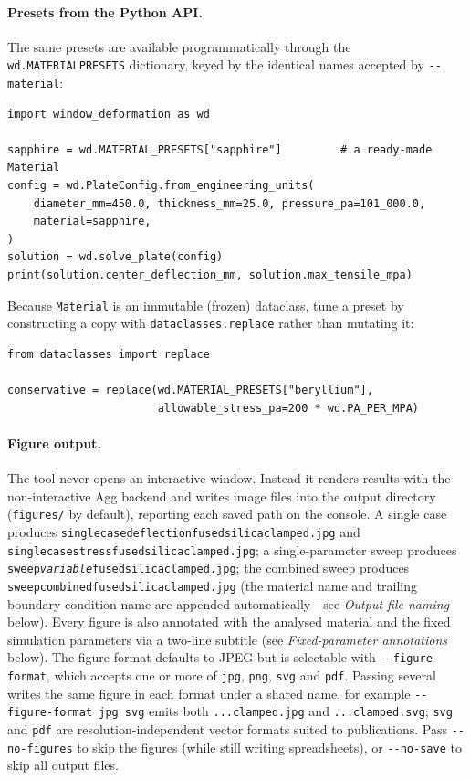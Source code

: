 \documentclass[11pt]{article}
\newcommand{\codeus}{\textunderscore\allowbreak}
\DeclareRobustCommand{\code}[1]{\texttt{\ifmmode\else\renewcommand{\_}{\codeus}\fi#1}}
\begin{document}
\paragraph{Presets from the Python API.} The same presets are available
programmatically through the \code{wd.MATERIAL\_PRESETS} dictionary, keyed by the
identical names accepted by \code{-{}-material}:
\begin{lstlisting}[style=pystyle]
import window_deformation as wd

sapphire = wd.MATERIAL_PRESETS["sapphire"]         # a ready-made Material
config = wd.PlateConfig.from_engineering_units(
    diameter_mm=450.0, thickness_mm=25.0, pressure_pa=101_000.0,
    material=sapphire,
)
solution = wd.solve_plate(config)
print(solution.center_deflection_mm, solution.max_tensile_mpa)
\end{lstlisting}

\noindent Because \code{Material} is an immutable (frozen) dataclass, tune a preset
by constructing a copy with \code{dataclasses.replace} rather than mutating it:
\begin{lstlisting}[style=pystyle]
from dataclasses import replace

conservative = replace(wd.MATERIAL_PRESETS["beryllium"],
                       allowable_stress_pa=200 * wd.PA_PER_MPA)
\end{lstlisting}

\paragraph{Figure output.} The tool never opens an interactive window. Instead it
renders results with the non-interactive Agg backend and writes image files
into the output directory (\code{figures/} by default), reporting each saved path
on the console. A single case produces
\code{single\_case\_deflection\_fused\_silica\_clamped.jpg}
and \code{single\_case\_stress\_fused\_silica\_clamped.jpg}; a single-parameter
sweep produces \code{sweep\_\textit{variable}\_fused\_silica\_clamped.jpg}; the
combined sweep produces \code{sweep\_combined\_fused\_silica\_clamped.jpg} (the
material name and trailing boundary-condition name are appended
automatically---see \emph{Output file naming} below). Every figure is also
annotated with the analysed material and the fixed simulation parameters via a
two-line subtitle (see \emph{Fixed-parameter annotations} below). The figure format
defaults to JPEG but is selectable with \code{-{}-figure-format}, which accepts one
or more of \code{jpg}, \code{png}, \code{svg} and \code{pdf}. Passing several
writes the same figure in each format under a shared name, for example
\code{-{}-figure-format jpg svg} emits both \code{...\_clamped.jpg} and
\code{...\_clamped.svg}; \code{svg} and \code{pdf} are resolution-independent
vector formats suited to publications. Pass
\code{-{}-no-figures} to skip the figures (while
still writing spreadsheets), or \code{-{}-no-save} to skip all output files.
\end{document}
